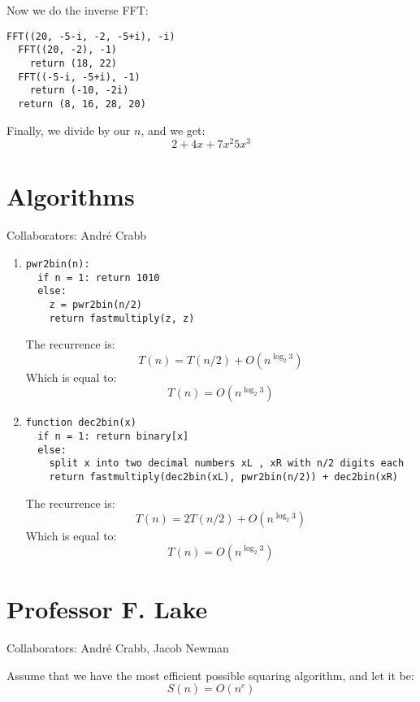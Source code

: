 \documentclass[11pt]{article}
\begin{document}
Now we do the inverse FFT:
\begin{verbatim}
FFT((20, -5-i, -2, -5+i), -i)
  FFT((20, -2), -1)
    return (18, 22)
  FFT((-5-i, -5+i), -1)
    return (-10, -2i)
  return (8, 16, 28, 20)
\end{verbatim}
Finally, we divide by our $n$, and we get:
\begin{equation*}
2 + 4x + 7x^2 5x^3
\end{equation*}
\newpage
\section{Algorithms}
Collaborators: Andr\'e Crabb

\begin{enumerate}
\item 
\begin{verbatim}
pwr2bin(n):
  if n = 1: return 1010
  else:
    z = pwr2bin(n/2)
    return fastmultiply(z, z)
\end{verbatim}

The recurrence is:
\begin{equation*}
T(n) = T(n/2) + O(n^{\log_2 3})
\end{equation*}
Which is equal to:
\begin{equation*}
T(n) = O(n^{\log_2 3})
\end{equation*}
\item
\begin{verbatim}
function dec2bin(x)
  if n = 1: return binary[x]
  else:
    split x into two decimal numbers xL , xR with n/2 digits each
    return fastmultiply(dec2bin(xL), pwr2bin(n/2)) + dec2bin(xR)
\end{verbatim}
The recurrence is:
\begin{equation*}
T(n) = 2T(n/2) + O(n^{\log_2 3})
\end{equation*}
Which is equal to:
\begin{equation*}
T(n) = O(n^{\log_2 3})
\end{equation*}
\end{enumerate}

\newpage
\section{Professor F. Lake}
Collaborators: Andr\'e Crabb, Jacob Newman


Assume that we have the most efficient possible squaring algorithm, and let it
be:
\begin{equation*}
S(n) = O(n^c)
\end{equation*}
\end{document}
